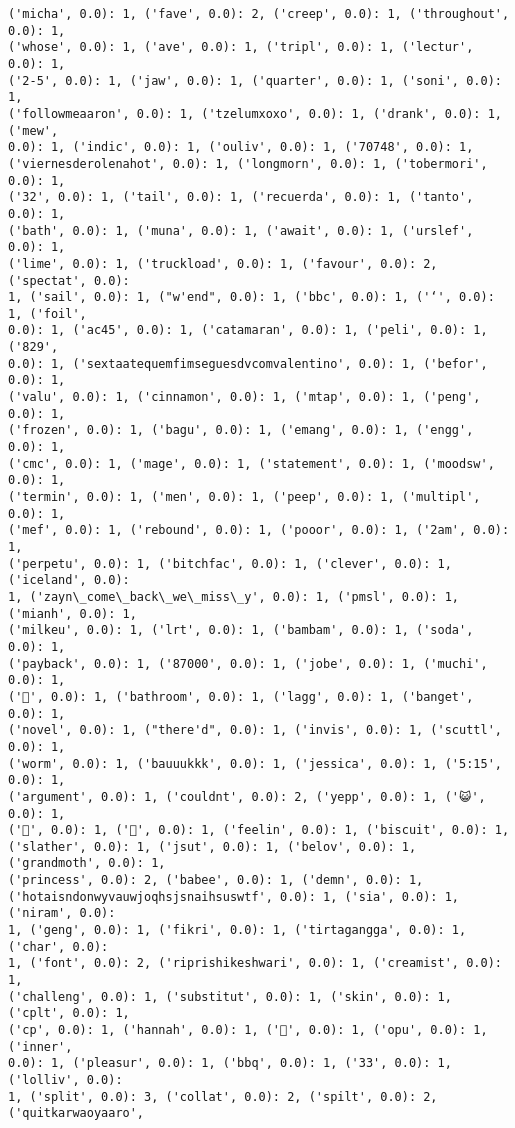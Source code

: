 \documentclass[11pt]{article}
\begin{document}
\begin{Verbatim}[commandchars=\\\{\}]
('micha', 0.0): 1, ('fave', 0.0): 2, ('creep', 0.0): 1, ('throughout', 0.0): 1,
('whose', 0.0): 1, ('ave', 0.0): 1, ('tripl', 0.0): 1, ('lectur', 0.0): 1,
('2-5', 0.0): 1, ('jaw', 0.0): 1, ('quarter', 0.0): 1, ('soni', 0.0): 1,
('followmeaaron', 0.0): 1, ('tzelumxoxo', 0.0): 1, ('drank', 0.0): 1, ('mew',
0.0): 1, ('indic', 0.0): 1, ('ouliv', 0.0): 1, ('70748', 0.0): 1,
('viernesderolenahot', 0.0): 1, ('longmorn', 0.0): 1, ('tobermori', 0.0): 1,
('32', 0.0): 1, ('tail', 0.0): 1, ('recuerda', 0.0): 1, ('tanto', 0.0): 1,
('bath', 0.0): 1, ('muna', 0.0): 1, ('await', 0.0): 1, ('urslef', 0.0): 1,
('lime', 0.0): 1, ('truckload', 0.0): 1, ('favour', 0.0): 2, ('spectat', 0.0):
1, ('sail', 0.0): 1, ("w'end", 0.0): 1, ('bbc', 0.0): 1, ('‘', 0.0): 1, ('foil',
0.0): 1, ('ac45', 0.0): 1, ('catamaran', 0.0): 1, ('peli', 0.0): 1, ('829',
0.0): 1, ('sextaatequemfimseguesdvcomvalentino', 0.0): 1, ('befor', 0.0): 1,
('valu', 0.0): 1, ('cinnamon', 0.0): 1, ('mtap', 0.0): 1, ('peng', 0.0): 1,
('frozen', 0.0): 1, ('bagu', 0.0): 1, ('emang', 0.0): 1, ('engg', 0.0): 1,
('cmc', 0.0): 1, ('mage', 0.0): 1, ('statement', 0.0): 1, ('moodsw', 0.0): 1,
('termin', 0.0): 1, ('men', 0.0): 1, ('peep', 0.0): 1, ('multipl', 0.0): 1,
('mef', 0.0): 1, ('rebound', 0.0): 1, ('pooor', 0.0): 1, ('2am', 0.0): 1,
('perpetu', 0.0): 1, ('bitchfac', 0.0): 1, ('clever', 0.0): 1, ('iceland', 0.0):
1, ('zayn\_come\_back\_we\_miss\_y', 0.0): 1, ('pmsl', 0.0): 1, ('mianh', 0.0): 1,
('milkeu', 0.0): 1, ('lrt', 0.0): 1, ('bambam', 0.0): 1, ('soda', 0.0): 1,
('payback', 0.0): 1, ('87000', 0.0): 1, ('jobe', 0.0): 1, ('muchi', 0.0): 1,
('🎈', 0.0): 1, ('bathroom', 0.0): 1, ('lagg', 0.0): 1, ('banget', 0.0): 1,
('novel', 0.0): 1, ("there'd", 0.0): 1, ('invis', 0.0): 1, ('scuttl', 0.0): 1,
('worm', 0.0): 1, ('bauuukkk', 0.0): 1, ('jessica', 0.0): 1, ('5:15', 0.0): 1,
('argument', 0.0): 1, ('couldnt', 0.0): 2, ('yepp', 0.0): 1, ('😺', 0.0): 1,
('💒', 0.0): 1, ('💎', 0.0): 1, ('feelin', 0.0): 1, ('biscuit', 0.0): 1,
('slather', 0.0): 1, ('jsut', 0.0): 1, ('belov', 0.0): 1, ('grandmoth', 0.0): 1,
('princess', 0.0): 2, ('babee', 0.0): 1, ('demn', 0.0): 1,
('hotaisndonwyvauwjoqhsjsnaihsuswtf', 0.0): 1, ('sia', 0.0): 1, ('niram', 0.0):
1, ('geng', 0.0): 1, ('fikri', 0.0): 1, ('tirtagangga', 0.0): 1, ('char', 0.0):
1, ('font', 0.0): 2, ('riprishikeshwari', 0.0): 1, ('creamist', 0.0): 1,
('challeng', 0.0): 1, ('substitut', 0.0): 1, ('skin', 0.0): 1, ('cplt', 0.0): 1,
('cp', 0.0): 1, ('hannah', 0.0): 1, ('💙', 0.0): 1, ('opu', 0.0): 1, ('inner',
0.0): 1, ('pleasur', 0.0): 1, ('bbq', 0.0): 1, ('33', 0.0): 1, ('lolliv', 0.0):
1, ('split', 0.0): 3, ('collat', 0.0): 2, ('spilt', 0.0): 2, ('quitkarwaoyaaro',

\end{Verbatim}
\end{document}
